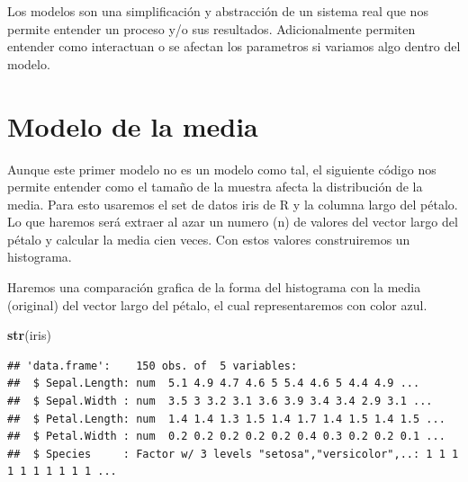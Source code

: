 \documentclass[
]{book}
\newenvironment{Shaded}{\begin{snugshade}}{\end{snugshade}}
\newcommand{\KeywordTok}[1]{\textcolor[rgb]{0.13,0.29,0.53}{\textbf{#1}}}
\newcommand{\NormalTok}[1]{#1}
\begin{document}
Los modelos son una simplificación y abstracción de un sistema real que nos permite entender un proceso y/o sus resultados. Adicionalmente permiten entender como interactuan o se afectan los parametros si variamos algo dentro del modelo.

\hypertarget{modelo-de-la-media}{%
\section{Modelo de la media}\label{modelo-de-la-media}}

Aunque este primer modelo no es un modelo como tal, el siguiente código nos permite entender como el tamaño de la muestra afecta la distribución de la media. Para esto usaremos el set de datos iris de R y la columna largo del pétalo. Lo que haremos será extraer al azar un numero (n) de valores del vector largo del pétalo y calcular la media cien veces. Con estos valores construiremos un histograma.

Haremos una comparación grafica de la forma del histograma con la media (original) del vector largo del pétalo, el cual representaremos con color azul.

\begin{Shaded}
\begin{Highlighting}[]
\KeywordTok{str}\NormalTok{(iris)}
\end{Highlighting}
\end{Shaded}

\begin{verbatim}
## 'data.frame':    150 obs. of  5 variables:
##  $ Sepal.Length: num  5.1 4.9 4.7 4.6 5 5.4 4.6 5 4.4 4.9 ...
##  $ Sepal.Width : num  3.5 3 3.2 3.1 3.6 3.9 3.4 3.4 2.9 3.1 ...
##  $ Petal.Length: num  1.4 1.4 1.3 1.5 1.4 1.7 1.4 1.5 1.4 1.5 ...
##  $ Petal.Width : num  0.2 0.2 0.2 0.2 0.2 0.4 0.3 0.2 0.2 0.1 ...
##  $ Species     : Factor w/ 3 levels "setosa","versicolor",..: 1 1 1 1 1 1 1 1 1 1 ...
\end{verbatim}
\end{document}
